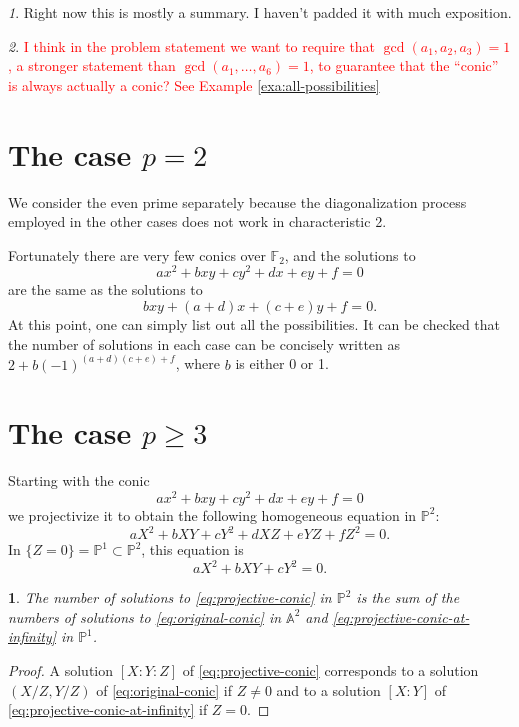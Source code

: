 \documentclass[10pt,a4paper]{amsart}
\numberwithin{equation}{section}
\numberwithin{figure}{section}
\theoremstyle{definition}
\theoremstyle{remark}
\newtheorem*{rem*}{\protect\remarkname}
\theoremstyle{plain}
\theoremstyle{plain}
\theoremstyle{definition}
\theoremstyle{plain}
\theoremstyle{plain}
\newtheorem{lem}{\protect\lemmaname}[section]
\providecommand{\lemmaname}{Lemma}
\providecommand{\remarkname}{Remark}
\begin{document}
\begin{rem*}
	Right now this is mostly a summary. I haven't padded it with much exposition.
\end{rem*}
\begin{rem*}
	\textcolor{red}{I think in the problem statement we want to require that $\gcd(a_1,a_2,a_3) = 1$, a stronger statement than $\gcd(a_1,\ldots,a_6)=1$, to guarantee that the ``conic'' is always actually a conic? See Example \ref{exa:all-possibilities}}
\end{rem*}
\section{The case $p = 2$}
We consider the even prime separately because the diagonalization process employed in the other cases does not work in characteristic 2.

Fortunately there are very few conics over $\mathbb{F}_2$, and the solutions to
\[
	ax^2 + bxy + cy^2 + dx + ey + f = 0
\]
are the same as the solutions to
\[
	bxy + (a+d)x + (c+e)y + f = 0.
\]
At this point, one can simply list out all the possibilities. It can be checked that the number of solutions in each case can be concisely written as $2 + b(-1)^{(a+d)(c+e) + f}$, where $b$ is either 0 or 1.

\section{The case $p \geq 3$}
Starting with the conic
\begin{equation}\label{eq:original-conic}
	ax^2 + bxy + cy^2 + dx + ey + f = 0
\end{equation}
we projectivize it to obtain the following homogeneous equation in $\mathbb{P}^2$:
\begin{equation}\label{eq:projective-conic}
	aX^2 + bXY + cY^2 + dXZ + eYZ + fZ^2 = 0.
\end{equation}
In $\{Z=0\} = \mathbb{P}^1 \subset \mathbb{P}^2$, this equation is
\begin{equation}\label{eq:projective-conic-at-infinity}
	aX^2 + bXY + cY^2 = 0.
\end{equation}

\begin{lem}
	The number of solutions to \eqref{eq:projective-conic} in $\mathbb{P}^2$ is the sum of the numbers of solutions to \eqref{eq:original-conic} in $\mathbb{A}^2$ and \eqref{eq:projective-conic-at-infinity} in $\mathbb{P}^1$.
	
\end{lem}
\begin{proof}
	A solution $[X:Y:Z]$ of \eqref{eq:projective-conic} corresponds to a solution $(X/Z,Y/Z)$ of \eqref{eq:original-conic} if $Z \neq 0$ and to a solution $[X:Y]$ of \eqref{eq:projective-conic-at-infinity} if $Z=0$.
\end{proof}
\end{document}
